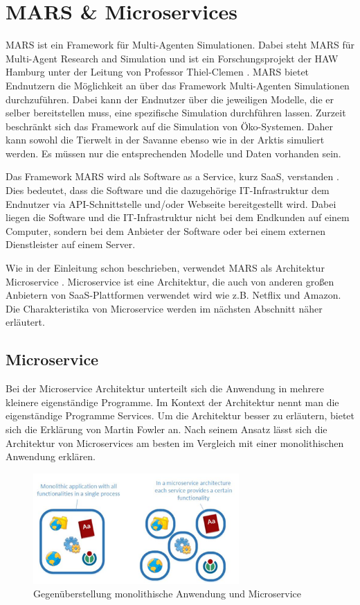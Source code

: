 \documentclass{llncs}
\begin{document}
\section{MARS \& Microservices}
MARS ist ein Framework für Multi-Agenten Simulationen. Dabei steht MARS für Multi-Agent Research and Simulation und ist ein Forschungsprojekt der HAW Hamburg unter der Leitung von Professor Thiel-Clemen \cite{mars, Huening2016}. MARS bietet Endnutzern die Möglichkeit an über das Framework Multi-Agenten Simulationen durchzuführen. Dabei kann der Endnutzer über die jeweiligen Modelle, die er selber bereitstellen muss, eine spezifische Simulation durchführen lassen. Zurzeit beschränkt sich das Framework auf die Simulation von Öko-Systemen. Daher kann sowohl die Tierwelt in der Savanne ebenso wie in der Arktis simuliert werden. Es müssen nur die entsprechenden Modelle und Daten vorhanden sein.

Das Framework MARS wird als Software as a Service, kurz SaaS, verstanden \cite{Huening2016}. Dies bedeutet, dass die Software und die dazugehörige IT-Infrastruktur dem Endnutzer via API-Schnittstelle und/oder Webseite bereitgestellt wird. Dabei liegen die Software und die IT-Infrastruktur nicht bei dem Endkunden auf einem Computer, sondern bei dem Anbieter der Software oder bei einem externen Dienstleister auf einem Server.

Wie in der Einleitung schon beschrieben, verwendet MARS als Architektur Microservice \cite{Huening2016}.  Microservice ist eine Architektur, die auch von anderen großen Anbietern von SaaS-Plattformen verwendet wird wie z.B. Netflix und Amazon\cite{pattern, heise}. Die Charakteristika von Microservice werden im nächsten Abschnitt näher erläutert.
\subsection{Microservice}
Bei der Microservice Architektur unterteilt sich die Anwendung in mehrere kleinere eigenständige Programme. Im  Kontext der Architektur nennt man die eigenständige Programme Services. Um die Architektur besser zu erläutern, bietet sich die Erklärung von Martin Fowler an. Nach seinem Ansatz lässt sich die Architektur von Microservices am besten im Vergleich mit einer monolithischen Anwendung erklären\cite{fowler2014}. 

\begin{figure}[htbp]
  \centering
      \includegraphics[width=0.7\textwidth]{monolithMicroservice.PNG}
    \caption{Gegenüberstellung monolithische Anwendung und Microservice \cite{locloud}}
    \label{fig:MonolithMicroservice}
\end{figure}
\end{document}
